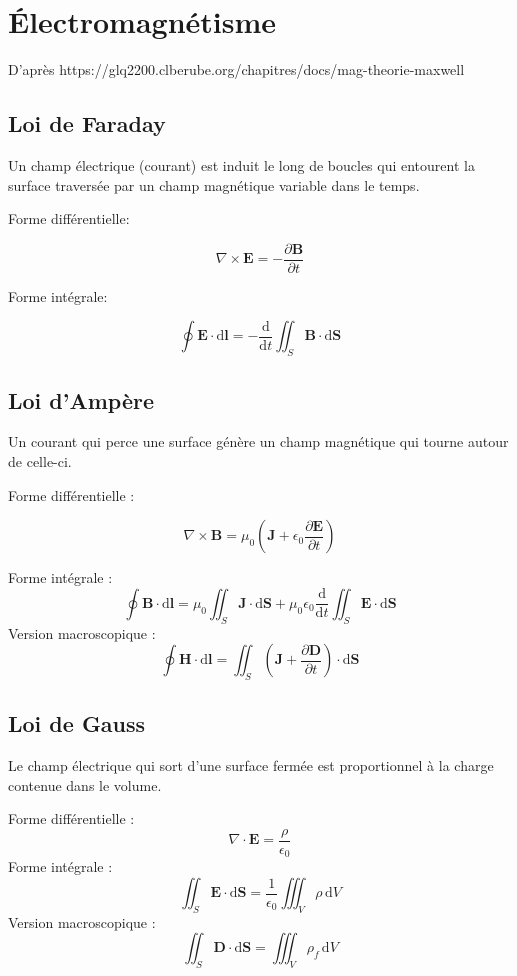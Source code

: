 
\chapter{Électromagnétisme}

{\footnotesize
D'après https://glq2200.clberube.org/chapitres/docs/mag-theorie-maxwell
}

\section{Loi de Faraday}
Un champ électrique (courant) est induit le long de boucles qui entourent la surface traversée par un champ magnétique variable dans le temps.

Forme différentielle:

\[
\nabla \times \boldsymbol{E} = - \frac{\partial{\boldsymbol{B}}}{\partial{t}}\]

Forme intégrale:

\[
\oint \boldsymbol{E} \cdot \mathrm{d}\boldsymbol{l} = -\frac{\mathrm{d}}{\mathrm{d}t} \iint_S \boldsymbol{B}\cdot \mathrm{d}\boldsymbol{S}
\]

\section{Loi d’Ampère}
Un courant qui perce une surface génère un champ magnétique qui tourne autour de celle-ci.

Forme différentielle :

\[
\nabla \times \boldsymbol{B} = \mu_0 \left( \boldsymbol{J} + \epsilon_0 \frac{\partial{\boldsymbol{E}}}{\partial{t}} \right)
\]


Forme intégrale :
\[\oint \boldsymbol{B} \cdot \mathrm{d}\boldsymbol{l} = \mu_0 \iint_S \boldsymbol{J}\cdot\mathrm{d}\boldsymbol{S} + \mu_0 \epsilon_0 \frac{\mathrm{d}}{\mathrm{d}t} \iint_S \boldsymbol{E}\cdot \mathrm{d}\boldsymbol{S}\]
Version macroscopique :
\[\oint \boldsymbol{H} \cdot \mathrm{d}\boldsymbol{l} = \iint_S \left( \boldsymbol{J} + \frac{\partial\boldsymbol{D}}{\partial t} \right) \cdot \mathrm{d}\boldsymbol{S}\]

\section{Loi de Gauss}
Le champ électrique qui sort d’une surface fermée est proportionnel à la charge contenue dans le volume.

Forme différentielle :
\[\nabla \cdot \boldsymbol{E} = \frac{\rho}{\epsilon_0}\]
Forme intégrale :
\[\iint_{S} \boldsymbol{E} \cdot \mathrm{d}\boldsymbol{S} = \frac{1}{\epsilon_0} \iiint_V \rho \,\mathrm{d}V\]
Version macroscopique :
\[\iint_{S} \boldsymbol{D} \cdot \mathrm{d}\boldsymbol{S} = \iiint_V \rho_f \,\mathrm{d}V\]

